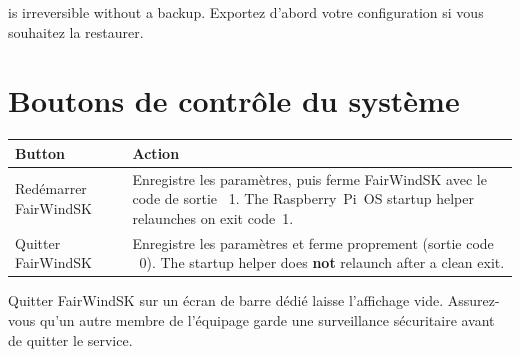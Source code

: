 \begin{warningbox}
 is irreversible without a backup.
Exportez d'abord votre configuration si vous souhaitez la restaurer.
\end{warningbox}

\section{Boutons de contrôle du système}

\begin{longtable}{L{3.2cm}L{10.5cm}}
\toprule
{}
\color{white}\sffamily\bfseries Button &
\color{white}\sffamily\bfseries Action \\
\midrule
Redémarrer FairWindSK&
Enregistre les paramètres, puis ferme FairWindSK avec le code de sortie ~1.
  The Raspberry~Pi~OS startup helper relaunches on exit code~1. \\
Quitter FairWindSK&
Enregistre les paramètres et ferme proprement (sortie code ~0).
  The startup helper does \textbf{not} relaunch after a clean exit. \\
\bottomrule
\end{longtable}

\begin{warningbox}
Quitter FairWindSK sur un écran de barre dédié laisse l'affichage vide.
Assurez-vous qu'un autre membre de l'équipage garde une surveillance sécuritaire avant de quitter le service.
\end{warningbox}
